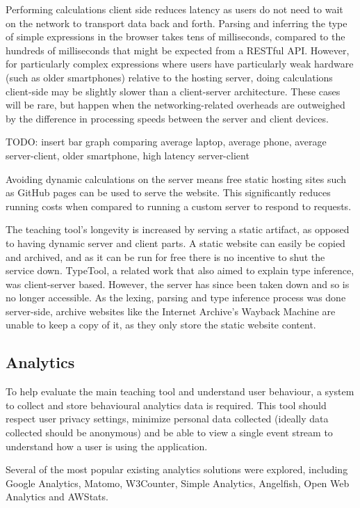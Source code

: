 \documentclass[a4paper,fleqn,12pt]{article}
\begin{document}
Performing calculations client side reduces latency as users do not need to wait on the network to transport data back and forth. Parsing and inferring the type of simple expressions in the browser takes tens of milliseconds, compared to the hundreds of milliseconds that might be expected from a RESTful API. However, for particularly complex expressions where users have particularly weak hardware (such as older smartphones) relative to the hosting server, doing calculations client-side may be slightly slower than a client-server architecture. These cases will be rare, but happen when the networking-related overheads are outweighed by the difference in processing speeds between the server and client devices.

TODO: insert bar graph comparing average laptop, average phone, average server-client, older smartphone, high latency server-client

Avoiding dynamic calculations on the server means free static hosting sites such as GitHub pages can be used to serve the website. This significantly reduces running costs when compared to running a custom server to respond to requests.

The teaching tool’s longevity is increased by serving a static artifact, as opposed to having dynamic server and client parts. A static website can easily be copied and archived, and as it can be run for free there is no incentive to shut the service down. TypeTool, a related work that also aimed to explain type inference, was client-server based. However, the server has since been taken down and so is no longer accessible. As the lexing, parsing and type inference process was done server-side, archive websites like the Internet Archive’s Wayback Machine are unable to keep a copy of it, as they only store the static website content.
\subsection{Analytics}\label{id:h.60njhv340fb0}
To help evaluate the main teaching tool and understand user behaviour, a system to collect and store behavioural analytics data is required. This tool should respect user privacy settings, minimize personal data collected (ideally data collected should be anonymous) and be able to view a single event stream to understand how a user is using the application.

Several of the most popular existing analytics solutions were explored, including Google Analytics, Matomo, W3Counter, Simple Analytics, Angelfish, Open Web Analytics and AWStats.
\end{document}
